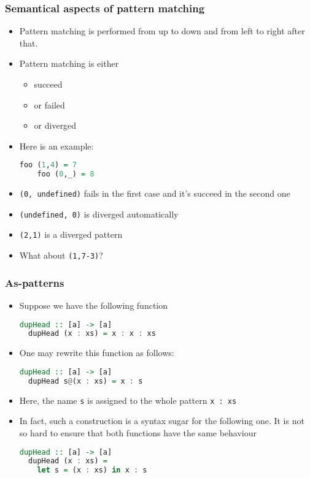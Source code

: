 \documentclass[10pt,pdf,utf8,russian,aspectratio=169]{beamer}
\begin{document}
\begin{frame}[fragile]
  \frametitle{Semantical aspects of pattern matching}
  \begin{itemize}
    \item Pattern matching is performed from up to down and from left to right after that.
    \item Pattern matching is either
    \begin{itemize}
      \item succeed
      \item or failed
      \item or diverged
    \end{itemize}
    \item Here is an example:
    \begin{lstlisting}[language=Haskell]
    foo (1,4) = 7
    foo (0,_) = 8
    \end{lstlisting}
    \item \verb"(0, undefined)" fails in the first case and it's succeed in the second one
    \item \verb"(undefined, 0)" is diverged automatically
    \item \verb"(2,1)" is a diverged pattern
    \item What about \verb"(1,7-3)"?
  \end{itemize}
\end{frame}

\begin{frame}[fragile]
  \frametitle{As-patterns}
  \begin{itemize}
  \item Suppose we have the following function
  \begin{lstlisting}[language=Haskell]
  dupHead :: [a] -> [a]
  dupHead (x : xs) = x : x : xs
  \end{lstlisting}
  \item One may rewrite this function as follows:
  \begin{lstlisting}[language=Haskell]
  dupHead :: [a] -> [a]
  dupHead s@(x : xs) = x : s
  \end{lstlisting}
  \item Here, the name \verb"s" is assigned to the whole pattern \verb"x : xs"
  \item In fact, such a construction is a syntax sugar for the following one. It is not so hard to ensure that both functions have the same behaviour
  \begin{lstlisting}[language=Haskell]
  dupHead :: [a] -> [a]
  dupHead (x : xs) =
    let s = (x : xs) in x : s
  \end{lstlisting}
\end{itemize}
\end{frame}
\end{document}
